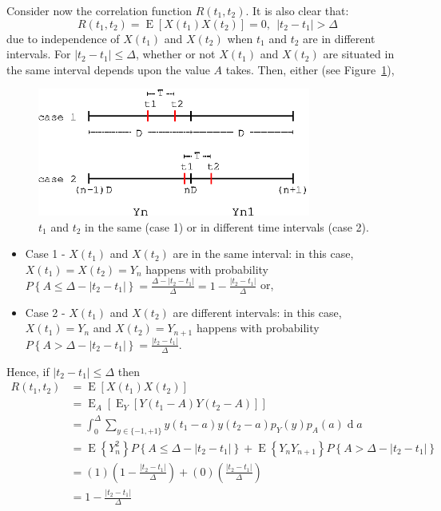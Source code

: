 \documentclass[12pt,letterpaper]{article}
\newcommand{\EE}{\operatorname{E}}
\newcommand{\dd}{\operatorname{d} \!}
\begin{document}
Consider now the correlation function $R(t_1, t_2)$. It is also clear that: 
\begin{equation}
R(t_1, t_2) = \EE\left[X(t_1) X(t_2)\right] =0, \ \ \left|t_2 - t_1 \right| > \Delta \label{eq:2.60}
\end{equation} 
due to independence of $X(t_1)$ and $X(t_2)$ when $t_1$ and $t_2$ are in different intervals. For $\left|t_2 - t_1 \right| \leq \Delta$, whether or not $X(t_1)$ and $X(t_2)$ are situated in the same interval depends upon the value $A$ takes. Then, either (see Figure~\ref{fig:cases_binary_noise}),
\begin{figure}[!ht]
\centering
{}
\includegraphics[width=0.8\textwidth]{cases_binary_noise.eps}
\caption{$t_1$ and $t_2$ in the same (case 1) or in different time intervals (case 2).}
\label{fig:cases_binary_noise}
\end{figure}
\begin{itemize}
 \item Case 1 - $X(t_1)$ and $X(t_2)$ are in the same interval: in this case, $X(t_1) = X(t_2) = Y_n$ happens with probability $P\left\{ A \leq \Delta - \left| t_2-t_1 \right| \right\} = \frac{\Delta - \left| t_2-t_1 \right|}{\Delta} = 1 - \frac{\left| t_2-t_1 \right|}{\Delta}$ or,
 \item Case 2 - $X(t_1)$ and $X(t_2)$ are different intervals: in this case, $X(t_1) = Y_n$ and $X(t_2) = Y_{n+1}$  happens with probability $P\left\{ A > \Delta - \left| t_2-t_1 \right| \right\} = \frac{\left| t_2-t_1 \right|}{\Delta}$.
\end{itemize}

Hence, if $\left|t_2 - t_1\right| \leq \Delta$ then
\begin{align}
R(t_1,t_2) &= \EE\left[X(t_1) X(t_2)\right] \\
&= \EE_{A}\left[\EE_Y\left[Y(t_1 - A) Y(t_2-A)\right]\right] \\
&= \int_0^\Delta \sum_{y\in \{-1, +1\}} y(t_1-a)y(t_2-a) p_Y(y) p_A(a) \dd a\\
&= \EE\left\{Y_n^2  \right\} P\left\{ A \leq \Delta - \left| t_2-t_1 \right| \right\} + \EE\left\{Y_n Y_{n+1}  \right\} P\left\{ A > \Delta - \left| t_2-t_1 \right| \right\}\\
&= (1)\left(1-\frac{\left|t_2-t_1\right|}{\Delta}\right) + (0)\left(\frac{\left|t_2-t_1 \right|}{\Delta}\right) \\
&= 1 - \frac{\left| t_2-t_1 \right|}{\Delta} \label{eq:2.61}
\end{align}
\end{document}
